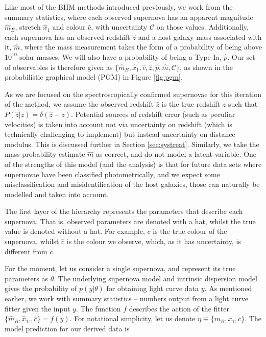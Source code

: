\documentclass[a4paper,fleqn,usenatbib]{mnras}
\newcommand{\cov}{\mathcal{C}}
\newcommand{\rubin}{\citetalias{Rubin2015}}
\begin{document}
Like most of the BHM methods introduced previously, we work from the summary statistics, where each observed supernova has an apparent magnitude $\hat{m}_B$, stretch $\hat{x}_1$ and colour $\hat{c}$, with uncertainty $\cov$ on those values. Additionally, each supernova has an observed redshift $\hat{z}$ and a host galaxy mass associated with it, $\hat{m}$, where the mass measurement takes the form of a probability of being above $10^{10}$ solar masses. We will also have a probability of being a Type Ia, $\hat{p}$. Our set of observables is therefore given as $\lbrace \hat{m}_B, \hat{x}_1, \hat{c}, \hat{z}, \hat{p}, \hat{m}, \cov \rbrace$, as shown in the probabilistic graphical model (PGM) in Figure \ref{fig:pgm}.


As we are focused on the spectroscopically confirmed supernovae for this iteration of the method, we assume the observed redshift $\hat{z}$ is the true redshift $z$ such that $P(\hat{z}|z) = \delta(\hat{z} - z)$. Potential sources of redshift error (such as peculiar velocities) is taken into account not via uncertainty on redshift (which is technically challenging to implement) but instead uncertainty on distance modulus. This is discussed further in Section \ref{sec:systreat}. Similarly, we take the mass probability estimate $\hat{m}$ as correct, and do not model a latent variable. One of the strengths of this model (and the {\rubin} analysis) is that for future data sets where supernovae have been classified photometrically, and we expect some misclassification and misidentification of the host galaxies, those can naturally be modelled and taken into account.

The first layer of the hierarchy represents the parameters that describe each supernova. That is, observed parameters are denoted with a hat, whilst the true value is denoted without a hat. For example, $c$ is the true colour of the supernova, whilst $\hat{c}$ is the colour we observe, which, as it has uncertainty, is different from $c$.

For the moment, let us consider a single supernova, and represent its true parameters as $\theta$. The underlying supernova model and intrinsic dispersion model gives the probability of $p(y|\theta)$ for obtaining light curve data $y$. As mentioned earlier, we work with summary statistics -- numbers output from a light curve fitter given the input $y$. The function $f$ describes the action of the fitter $\lbrace \hat{m}_B, \hat{x}_1., \hat{c} \rbrace = f(y)$. For notational simplicity, let us denote $\eta \equiv \lbrace m_B, x_1, c \rbrace$. The model prediction for our derived data is
\end{document}
